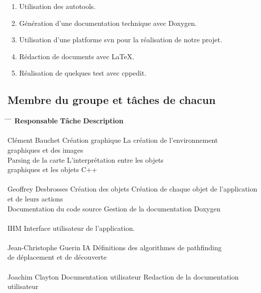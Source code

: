 \documentclass[a4paper 12pts]{article}
\begin{document}
\begin{enumerate}
\item Utilisation des autotools.
\item Génération d'une documentation technique avec Doxygen.
\item Utilisation d'une platforme svn pour la réalisation de notre projet.
\item Rédaction de documents avec \LaTeX .
\item Réalisation de quelques test avec cppedit.

\end{enumerate}

\vspace{075 cm}

\subsection{Membre du groupe et tâches de chacun}


\vspace{1 cm}

\begin{tabbing}

\hspace{3.8cm} \= \hspace{5.2cm} \= \hspace{2cm} \= \kill
\textbf{Responsable} \> \textbf{Tâche} \> \textbf {Description} \\
\\
Clément Bauchet \> Création graphique \> La création de l'environnement \\
 \> \>graphiques et des images \\					
\> Parsing de la carte \>L'interprétation entre les objets \\
\> \> graphiques et les objets C++\\					
\\
Geoffrey Desbrosses \> Création des objets \> Création de chaque objet de l'application\\
\> \> et de leurs actions\\
\> Documentation du code source \> Gestion de la documentation Doxygen \\ 
\\
\> IHM \> Interface utilisateur de l'application. \> \\
\\
Jean-Christophe Guerin \> IA  \> Définitions des algorithmes de pathfinding\\
\> \> de déplacement et de découverte\\	
\\
Joachim Clayton \> Documentation utilisateur \> Redaction de la documentation utilisateur \\
\\ 
\end{tabbing}
\end{document}
